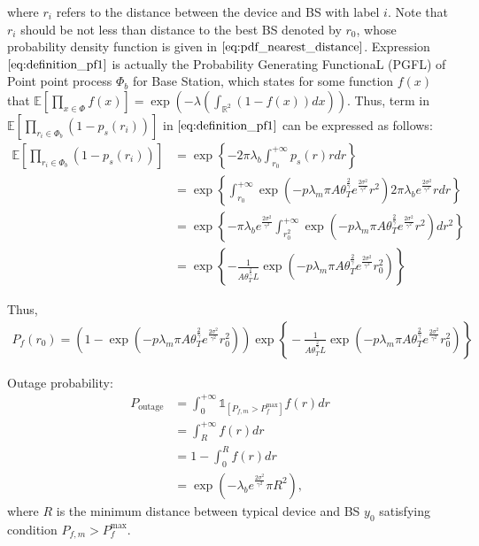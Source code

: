 where $r_i$ refers to the distance between the device and BS with label $i$. Note that $r_i$ should be not less than distance to the best BS denoted by $r_{0}$, whose probability density function is given in $\eqref{eq:pdf_nearest_distance}$. Expression $\eqref{eq:definition_pf1}$ is actually the Probability Generating FunctionaL (PGFL) of Point point process $\Phi_{b}$ for Base Station, which states for some function $f(x)$ that $\mathbb{E}\left[ \prod_{x \in \Phi}f(x) \right] = \exp(-\lambda(\int_{\mathbb{R}^2}(1-f(x))dx))$. Thus, term in $\mathbb{E} \left[  \prod_{r_i \in \Phi_{b}} (1-p_{s}(r_i)) \right]$ in $\eqref{eq:definition_pf1}$ can be expressed as follows:
\begin{align}
\mathbb{E} \left[  \prod_{r_i \in \Phi_{b}} (1-p_{s}(r_i)) \right] &= \exp\left\lbrace -2\pi \lambda_{b} \int_{r_{0}}^{+\infty} p_{s}(r)rdr \right\rbrace \nonumber\\
&= \exp\left\lbrace  \int_{r_{0}}^{+\infty}  \exp(-p \lambda_{m} \pi A \theta_{T}^{\frac{2}{\gamma}} e^{\frac{2\sigma^2}{\gamma^2}}  r^2) 2 \pi \lambda_b e^{\frac{2\sigma^2}{\gamma^2}}  rdr  \right\rbrace \nonumber \\ 
&= \exp\left\lbrace -\pi \lambda_{b} e^{\frac{2\sigma^2}{\gamma^2}}  \int_{r_{0}^{2}}^{+\infty}  \exp(-p \lambda_{m} \pi A \theta_{T}^{\frac{2}{\gamma}} e^{\frac{2\sigma^2}{\gamma^2}}  r^2 ) dr^2  \right\rbrace \nonumber\\ 
&= \exp\left\lbrace -\frac{1}{ A \theta_{T}^{\frac{2}{\gamma}}  L }  \exp(-p \lambda_{m} \pi A \theta_{T}^{\frac{2}{\gamma}} e^{  \frac{2\sigma^2}{\gamma^2}  } r_{0}^2)  \right\rbrace
\end{align} 

Thus,
\begin{align}
P_{f}(r_{0}) = ( 1- \exp(-p \lambda_{m} \pi A \theta_{T}^{\frac{2}{\gamma}} e^{\frac{2\sigma^2}{\gamma^2}}  r_{0}^2 ) )\exp\left\lbrace \!\!\!-\frac{1}{ A \theta_{T}^{\frac{2}{\gamma}}  L }  \!\exp(-p \lambda_{m} \pi A \theta_{T}^{\frac{2}{\gamma}} e^{  \frac{2\sigma^2}{\gamma^2}  } r_{0}^2)  \!\!\!\right\rbrace
\end{align}


Outage probability:
\begin{align}
	P_{\text{outage}} &= \int_{0}^{+\infty} \mathds{1}_{\left[ P_{f, m} > P_{f}^{\text{max}}\right] }f(r) dr \nonumber \\
	&= \int_{R}^{+\infty} f(r) dr \nonumber \\
	&= 1 - \int_{ 0 }^{ R } f(r) dr \nonumber \\
	&=  \exp( -\lambda_b  e^{\frac{2\sigma^2}{\gamma^2}} \pi R^2 ),
\end{align}
where $R$ is the minimum distance between typical device and BS $y_0$ satisfying condition $P_{f, m} > P_{f}^{\text{max}}$.


